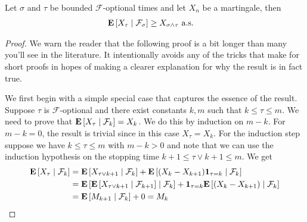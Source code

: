 \begin{thm}\label{OptionalStoppingDiscrete}Let $\sigma$ and $\tau$ be bounded
  $\mathcal{F}$-optional times and
  let $X_n$ be a martingale, then 
\begin{align*}
\cexpectationlong{\mathcal{F}_\sigma}{X_\tau} &\geq X_{\sigma \wedge
  \tau}
\text{ a.s.}
\end{align*}
\end{thm}
\begin{proof}
We warn the reader that the following proof is a bit longer than many
you'll see in the literature.  It intentionally avoids any of the
tricks that make for short proofs in hopes of making a clearer
explanation for why the result is in fact true.

We first begin with a simple special case that captures the essence of
the result.  Suppose $\tau$ is $\mathcal{F}$-optional and there exist
constants $k, m$ such that $k \leq \tau \leq m$.  We need to prove
that $\cexpectationlong{\mathcal{F}_k}{X_\tau} = X_k$.  We do this by
induction on $m-k$.  For $m-k=0$, the result is trivial since in this
case $X_\tau = X_k$.  For the induction step suppose we have $k \leq
\tau \leq m$ with $m-k >0$ and note that we can use the induction
hypothesis on the stopping time $k+1 \leq \tau\vee k+1 \leq m$.  We
get
\begin{align*}
\cexpectationlong{\mathcal{F}_k}{X_\tau} &=
\cexpectationlong{\mathcal{F}_k}{X_{\tau \vee k+1}} +
\cexpectationlong{\mathcal{F}_k}{(X_k-X_{k+1})\characteristic{\tau=k}}
\\
&=\cexpectationlong{\mathcal{F}_k}{\cexpectationlong{\mathcal{F}_{k+1}}{X_{\tau
      \vee k+1}} } +
\characteristic{\tau=k}\cexpectationlong{\mathcal{F}_k}{(X_k-X_{k+1})}
\\
&=\cexpectationlong{\mathcal{F}_k}{M_{k+1}} + 0 = M_k
\end{align*}


\end{proof}
